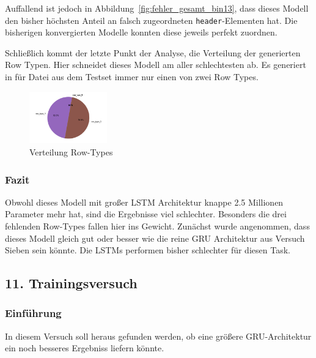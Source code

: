 \documentclass[pdftex,a4paper,halfparskip, article]{scrartcl}
\begin{document}
\begin{figure}
\begin{minipage}{.33\textwidth}
  \label{fig:fehler_schlechteste20_bin13}
\end{minipage}%
\end{figure}

Auffallend ist jedoch in Abbildung~\ref{fig:fehler_gesamt_bin13}, dass dieses Modell den bisher höchsten Anteil an falsch zugeordneten \texttt{header}-Elementen hat. Die bisherigen konvergierten Modelle konnten diese jeweils perfekt zuordnen. 

Schließlich kommt der letzte Punkt der Analyse, die Verteilung der generierten Row Typen. Hier schneidet dieses Modell am aller schlechtesten ab. Es generiert in für Datei aus dem Testset immer nur einen von zwei Row Types. 

\begin{figure}[h]
\label{fig:bin13_row_type}

\centering
\includegraphics[width=0.3\textwidth]{predictions_bin13_predicted_row_type_distribution}
\caption{Verteilung Row-Types}
\end{figure}


\subsubsection*{Fazit}

Obwohl dieses Modell mit großer LSTM Architektur knappe 2.5 Millionen Parameter mehr hat, sind die Ergebnisse viel schlechter. Besonders die drei fehlenden Row-Types fallen hier ins Gewicht. Zunächst wurde angenommen, dass dieses Modell gleich gut oder besser wie die reine GRU Architektur aus Versuch Sieben sein könnte. Die LSTMs performen bisher schlechter für diesen Task. 




\subsection{11. Trainingsversuch}\label{sec:elf}


\subsubsection*{Einführung}
In diesem Versuch soll heraus gefunden werden, ob eine größere GRU-Architektur ein noch besseres Ergebniss liefern könnte.
\end{document}
